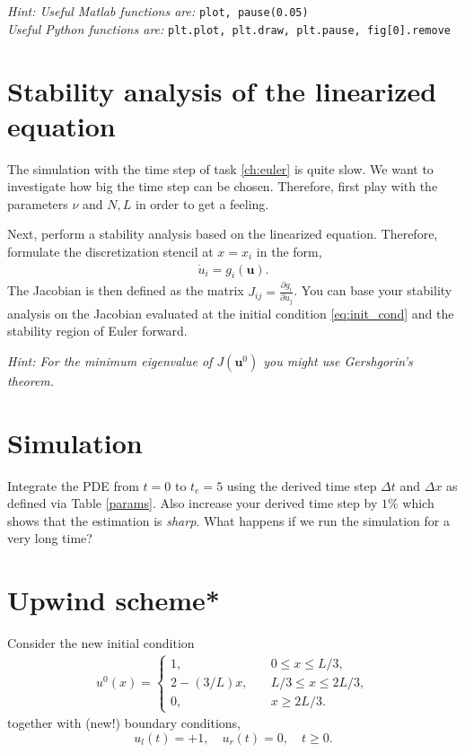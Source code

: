 \documentclass[a4paper,10pt]{article}
\begin{document}
\textit{Hint: Useful Matlab functions are: } \texttt{plot, pause(0.05) }\\
\textit{\phantom{\indent Hint:} Useful Python functions are: } \texttt{plt.plot, plt.draw, plt.pause, fig[0].remove}
\section{Stability analysis of the linearized equation}
\label{eq:timestep}
The simulation with the time step of task \ref{ch:euler} is quite slow. We want to investigate how big the time step can be chosen. Therefore, first play with the parameters $\nu$ and $N,L$ in order to get a feeling.

Next, perform a stability analysis based on the linearized equation. Therefore, formulate the discretization stencil at $x=x_i$ in the form,
\begin{align*}
 \dot{u}_i = g_i(\mathbf{u}).
\end{align*}
The Jacobian is then defined as the matrix $J_{ij} = \frac{\partial g_i}{\partial u_j}$. You can base your stability analysis on the Jacobian evaluated at the initial condition \eqref{eq:init_cond} and the stability region of Euler forward.

\textit{Hint: For the minimum eigenvalue of $J(\mathbf{u}^0)$ you might use Gershgorin's theorem.}
\section{Simulation}
Integrate the PDE from $t=0$ to $t_e=5$ using the derived time step $\Delta t$ and $\Delta x$ as defined via Table \ref{params}. Also increase your derived time step by $1\%$ which shows that the estimation is \textit{sharp}. What happens if we run the simulation for a very long time?

\section{Upwind scheme*}
Consider the new initial condition 
\begin{align*}
 u^0(x) = \begin{cases}
           1, &\quad 0 \leq x \leq L/3, \\
           2-(3/L) x, &\quad L/3 \leq x \leq 2L/3,\\
           0, &\quad x \geq 2L/3.
          \end{cases}
\end{align*}
together with (new!) boundary conditions,
\[
 u_l(t) = +1, \quad u_r(t) = 0, \quad t \geq 0.
\]
\end{document}
